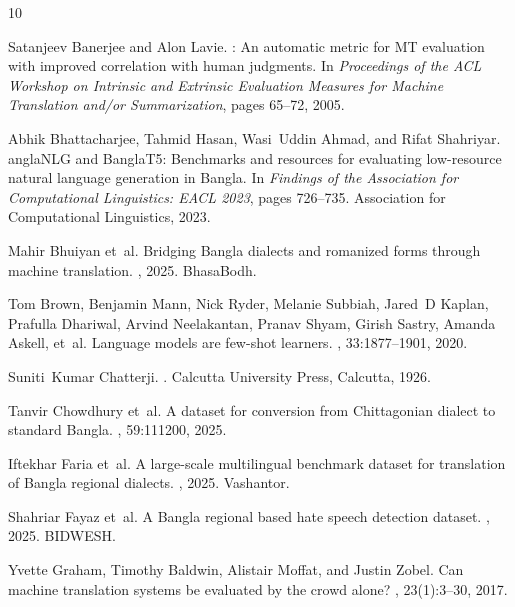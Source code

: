 \documentclass[12pt,a4paper]{article}
\begin{document}
\begin{thebibliography}{10}

Satanjeev Banerjee and Alon Lavie.
: An automatic metric for {MT} evaluation with improved
  correlation with human judgments.
\newblock In {\em Proceedings of the ACL Workshop on Intrinsic and Extrinsic
  Evaluation Measures for Machine Translation and/or Summarization}, pages
  65--72, 2005.

Abhik Bhattacharjee, Tahmid Hasan, Wasi~Uddin Ahmad, and Rifat Shahriyar.
angla{NLG} and {B}angla{T}5: Benchmarks and resources for
  evaluating low-resource natural language generation in {B}angla.
\newblock In {\em Findings of the Association for Computational Linguistics:
  EACL 2023}, pages 726--735. Association for Computational Linguistics, 2023.

Mahir Bhuiyan et~al.
\newblock Bridging {B}angla dialects and romanized forms through machine
  translation.
, 2025.
\newblock BhasaBodh.

Tom Brown, Benjamin Mann, Nick Ryder, Melanie Subbiah, Jared~D Kaplan, Prafulla
  Dhariwal, Arvind Neelakantan, Pranav Shyam, Girish Sastry, Amanda Askell,
  et~al.
\newblock Language models are few-shot learners.
,
  33:1877--1901, 2020.

Suniti~Kumar Chatterji.
.
\newblock Calcutta University Press, Calcutta, 1926.

Tanvir Chowdhury et~al.
\newblock A dataset for conversion from {C}hittagonian dialect to standard
  {B}angla.
, 59:111200, 2025.

Iftekhar Faria et~al.
\newblock A large-scale multilingual benchmark dataset for translation of
  {B}angla regional dialects.
, 2025.
\newblock Vashantor.

Shahriar Fayaz et~al.
\newblock A {B}angla regional based hate speech detection dataset.
, 2025.
\newblock BIDWESH.

Yvette Graham, Timothy Baldwin, Alistair Moffat, and Justin Zobel.
\newblock Can machine translation systems be evaluated by the crowd alone?
, 23(1):3--30, 2017.


\end{thebibliography}
\end{document}
